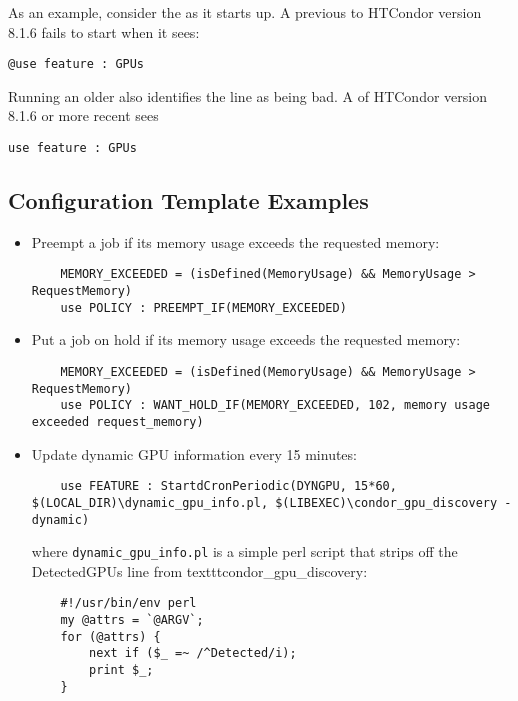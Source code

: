 As an example, consider the  as it starts up.
A  previous to HTCondor version 8.1.6 fails to start
when it sees:
\begin{verbatim}
@use feature : GPUs
\end{verbatim}
Running an older  also identifies the 
line as being bad.
A  of HTCondor version 8.1.6 or more recent sees
\begin{verbatim}
use feature : GPUs
\end{verbatim}

\subsection{\label{sec:Config-Template-Examples}Configuration Template
Examples}

\begin{itemize}
\item Preempt a job if its memory usage exceeds the requested memory:
    \begin{verbatim}
	MEMORY_EXCEEDED = (isDefined(MemoryUsage) && MemoryUsage > RequestMemory)
	use POLICY : PREEMPT_IF(MEMORY_EXCEEDED)
    \end{verbatim}

\item Put a job on hold if its memory usage exceeds the requested memory:
    \begin{verbatim}
	MEMORY_EXCEEDED = (isDefined(MemoryUsage) && MemoryUsage > RequestMemory)
	use POLICY : WANT_HOLD_IF(MEMORY_EXCEEDED, 102, memory usage exceeded request_memory)
    \end{verbatim}

\item Update dynamic GPU information every 15 minutes:

    \begin{verbatim}
	use FEATURE : StartdCronPeriodic(DYNGPU, 15*60, $(LOCAL_DIR)\dynamic_gpu_info.pl, $(LIBEXEC)\condor_gpu_discovery -dynamic)
    \end{verbatim}

where \texttt{dynamic\_gpu\_info.pl}  is a simple perl script that strips
off the DetectedGPUs line from texttt{condor\_gpu\_discovery}:

    \begin{verbatim}
	#!/usr/bin/env perl
	my @attrs = `@ARGV`;
	for (@attrs) {
		next if ($_ =~ /^Detected/i);
		print $_;
	}
    \end{verbatim}
\end{itemize}
